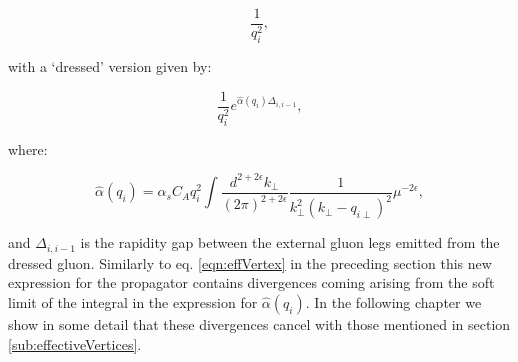 		\begin{equation}
			\frac{1}{q_i^2},
		\end{equation}

		with a `dressed' version given by:

		\begin{equation}
			\frac{1}{q_i^2}e^{\hat{\alpha}(q_i)\Delta_{i,i-1}},
		\end{equation}

		where:

		\begin{equation}
			\hat{\alpha}(q_i) = \alpha_sC_Aq_i^2\int \frac{d^{2+2\epsilon}k_{\perp}}{(2\pi)^{2+2\epsilon}}
			\frac{1}{k^2_\perp(k_\perp - q_{i\perp})^2}\mu^{-2\epsilon},
		\end{equation}

		and $\Delta_{i,i-1}$ is the rapidity gap between the external gluon legs emitted from
		the dressed gluon.  Similarly to eq. \eqref{eqn:effVertex} in the preceding section this
		new expression for the propagator contains divergences coming arising from the soft limit
		of the integral in the expression for $\hat{\alpha}(q_i)$.  In the following chapter we
		show in some detail that these divergences cancel with those mentioned in section
		\ref{sub:effectiveVertices}.
